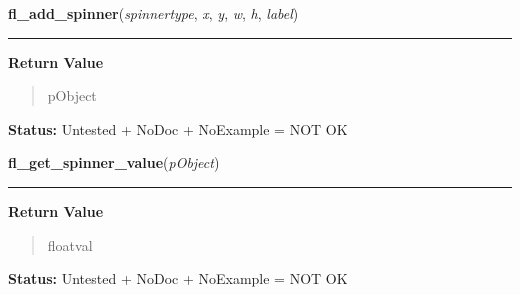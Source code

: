     \label{xformslib:library:fl_add_spinner}

    \vspace{0.5ex}

\hspace{.8\funcindent}\begin{boxedminipage}{\funcwidth}

    \raggedright \textbf{fl\_add\_spinner}(\textit{spinnertype}, \textit{x}, \textit{y}, \textit{w}, \textit{h}, \textit{label})

    \vspace{-1.5ex}

    \rule{\textwidth}{0.5\fboxrule}
\setlength{\parskip}{2ex}
\setlength{\parskip}{1ex}
      \textbf{Return Value}
    \vspace{-1ex}

      \begin{quote}
      pObject

      \end{quote}

\textbf{Status:} Untested + NoDoc + NoExample = NOT OK



    \end{boxedminipage}

    \label{xformslib:library:fl_get_spinner_value}

    \vspace{0.5ex}

\hspace{.8\funcindent}\begin{boxedminipage}{\funcwidth}

    \raggedright \textbf{fl\_get\_spinner\_value}(\textit{pObject})

    \vspace{-1.5ex}

    \rule{\textwidth}{0.5\fboxrule}
\setlength{\parskip}{2ex}
\setlength{\parskip}{1ex}
      \textbf{Return Value}
    \vspace{-1ex}

      \begin{quote}
      floatval

      \end{quote}

\textbf{Status:} Untested + NoDoc + NoExample = NOT OK



    \end{boxedminipage}

